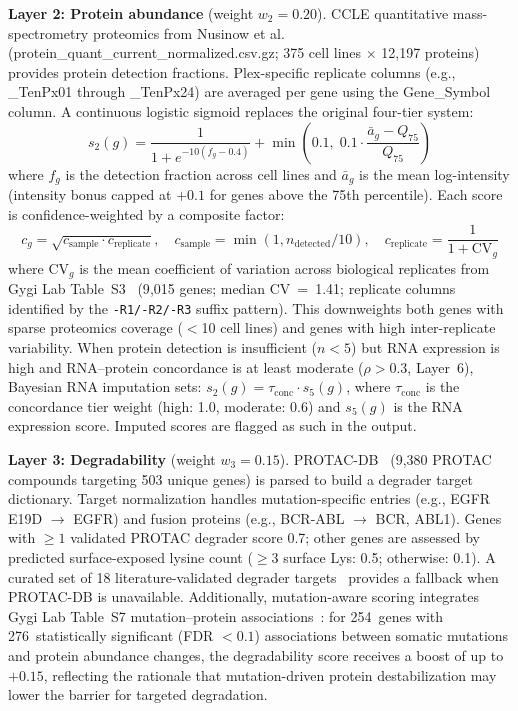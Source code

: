 \documentclass[11pt]{article}
\begin{document}
\textbf{Layer 2: Protein abundance} (weight $w_2 = 0.20$). CCLE quantitative mass-spectrometry proteomics from Nusinow et al.~\cite{Nusinow2020} (protein\_quant\_current\_normalized.csv.gz; 375 cell lines $\times$ 12{,}197 proteins) provides protein detection fractions. Plex-specific replicate columns (e.g., \_TenPx01 through \_TenPx24) are averaged per gene using the Gene\_Symbol column. A continuous logistic sigmoid replaces the original four-tier system:
\begin{equation}
s_2(g) = \frac{1}{1 + e^{-10(f_g - 0.4)}} + \min\!\left(0.1,\; 0.1 \cdot \frac{\bar{a}_g - Q_{75}}{Q_{75}}\right)
\end{equation}
where $f_g$ is the detection fraction across cell lines and $\bar{a}_g$ is the mean log-intensity (intensity bonus capped at $+0.1$ for genes above the 75th percentile). Each score is confidence-weighted by a composite factor:
\begin{equation}
c_g = \sqrt{c_{\text{sample}} \cdot c_{\text{replicate}}}, \quad c_{\text{sample}} = \min(1, n_{\text{detected}}/10), \quad c_{\text{replicate}} = \frac{1}{1 + \text{CV}_g}
\end{equation}
where $\text{CV}_g$ is the mean coefficient of variation across biological replicates from Gygi Lab Table~S3~\cite{Nusinow2020} (9{,}015 genes; median CV~=~1.41; replicate columns identified by the \texttt{-R1/-R2/-R3} suffix pattern). This downweights both genes with sparse proteomics coverage ($<$10 cell lines) and genes with high inter-replicate variability. When protein detection is insufficient ($n < 5$) but RNA expression is high and RNA--protein concordance is at least moderate ($\rho > 0.3$, Layer~6), Bayesian RNA imputation sets: $s_2(g) = \tau_{\text{conc}} \cdot s_5(g)$, where $\tau_{\text{conc}}$ is the concordance tier weight (high: 1.0, moderate: 0.6) and $s_5(g)$ is the RNA expression score. Imputed scores are flagged as such in the output.

\textbf{Layer 3: Degradability} (weight $w_3 = 0.15$). PROTAC-DB~\cite{Weng2021} (9{,}380 PROTAC compounds targeting 503 unique genes) is parsed to build a degrader target dictionary. Target normalization handles mutation-specific entries (e.g., EGFR E19D $\rightarrow$ EGFR) and fusion proteins (e.g., BCR-ABL $\rightarrow$ BCR, ABL1). Genes with $\geq 1$ validated PROTAC degrader score 0.7; other genes are assessed by predicted surface-exposed lysine count ($\geq 3$ surface Lys: 0.5; otherwise: 0.1). A curated set of 18 literature-validated degrader targets~\cite{Bai2019} provides a fallback when PROTAC-DB is unavailable. Additionally, mutation-aware scoring integrates Gygi Lab Table~S7 mutation--protein associations~\cite{Nusinow2020}: for 254~genes with 276~statistically significant (FDR $< 0.1$) associations between somatic mutations and protein abundance changes, the degradability score receives a boost of up to $+0.15$, reflecting the rationale that mutation-driven protein destabilization may lower the barrier for targeted degradation.
\end{document}
